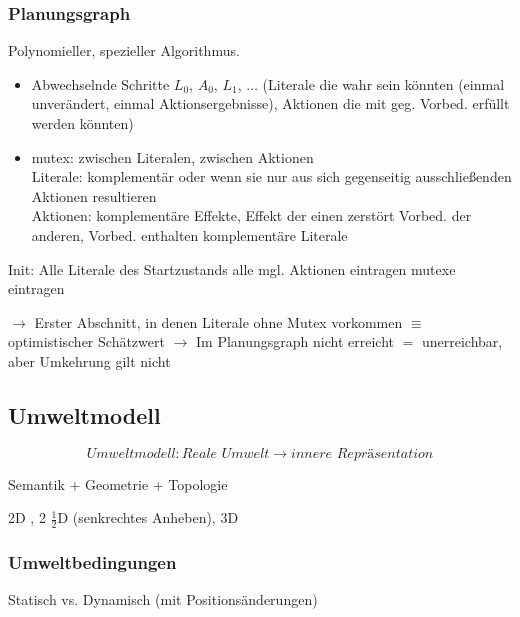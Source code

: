 \subsubsection{Planungsgraph}

Polynomieller, spezieller Algorithmus.
\begin{itemize}
	\item Abwechselnde Schritte $L_0$, $A_0$, $L_1$, $\dots$ (Literale die wahr sein könnten (einmal unverändert, einmal Aktionsergebnisse), Aktionen die mit geg. Vorbed. erfüllt werden könnten)
	\item mutex: zwischen Literalen, zwischen Aktionen \\
	Literale: komplementär oder wenn sie nur aus sich gegenseitig ausschließenden Aktionen resultieren \\
	Aktionen: komplementäre Effekte, Effekt der einen zerstört Vorbed. der anderen, Vorbed. enthalten komplementäre Literale
\end{itemize}

\begin{algorithmic}
	\State Init: Alle Literale des Startzustands
		\State alle mgl. Aktionen eintragen
		\State mutexe eintragen
	\EndWhile
\end{algorithmic}

$\rightarrow$ Erster Abschnitt, in denen Literale ohne Mutex vorkommen $\equiv$ optimistischer Schätzwert
$\rightarrow$ Im Planungsgraph nicht erreicht $=$ unerreichbar, aber Umkehrung gilt nicht

\subsection{Umweltmodell}

$$\textit{Umweltmodell} : \textit{Reale Umwelt} \to \textit{innere Repräsentation}$$

\begin{center}
Semantik + Geometrie + Topologie
\end{center}

\begin{center}
2D , 2 $\frac{1}{2}$D (senkrechtes Anheben), 3D
\end{center}

\subsubsection{Umweltbedingungen}

Statisch vs. Dynamisch (mit Positionsänderungen) \\

